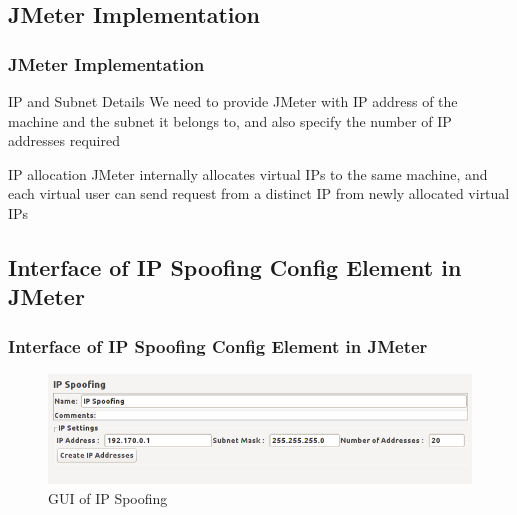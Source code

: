 \documentclass[12pt]{beamer}
\begin{document}
\subsection{JMeter Implementation}
\begin{frame}[c]
\frametitle{JMeter Implementation}
  \begin{block}{IP and Subnet Details}
	We need to provide JMeter with IP address of the machine and the subnet it belongs to, and also specify the number of IP addresses required
  \end{block}
  \begin{block}{IP allocation}
	JMeter internally allocates virtual IPs to the same machine, and each virtual user can send request from a distinct IP from newly allocated virtual IPs
  \end{block}
\end{frame}

\subsection{Interface of IP Spoofing Config Element in JMeter}
\begin{frame}[c]
\frametitle{Interface of IP Spoofing Config Element in JMeter}
\begin{figure}
 \centering
 \includegraphics[width=12cm]{images/interface.png}
 \caption{GUI of IP Spoofing}
\end{figure}
\end{frame}

\end{document}
